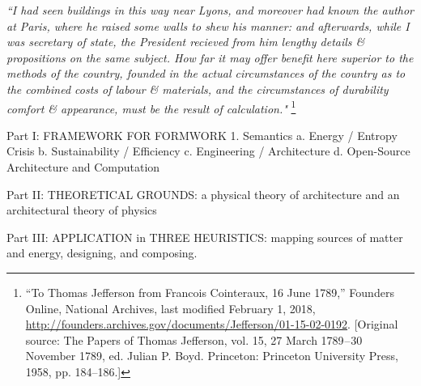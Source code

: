 \begin{flushright}
\small{
\textit{``I had seen buildings in this way near Lyons, and moreover had known the author at Paris, where he raised some walls to shew his manner: and afterwards, while I was secretary of state, the President recieved from him lengthy details \& propositions on the same subject. How far it may offer benefit here superior to the methods of the country, founded in the actual circumstances of the country as to the combined costs of labour \& materials, and the circumstances of durability comfort \& appearance, must be the result of calculation."}} \footnote{“To Thomas Jefferson from Francois Cointeraux, 16 June 1789,” Founders Online, National Archives, last modified February 1, 2018, \url{http://founders.archives.gov/documents/Jefferson/01-15-02-0192}. [Original source: The Papers of Thomas Jefferson, vol. 15, 27 March 1789 – 30 November 1789, ed. Julian P. Boyd. Princeton: Princeton University Press, 1958, pp. 184–186.]}
\end{flushright}

\clearpage

Part I: FRAMEWORK FOR FORMWORK
  1. Semantics
    a. Energy / Entropy Crisis
    b. Sustainability / Efficiency
    c. Engineering / Architecture
    d. Open-Source Architecture and Computation


Part II: THEORETICAL GROUNDS: a physical theory of architecture and an architectural theory of physics

Part III: APPLICATION in THREE HEURISTICS: mapping sources of matter and energy, designing, and composing.
